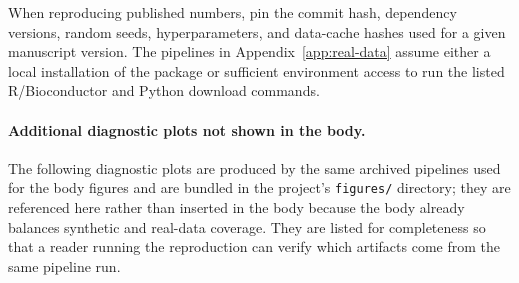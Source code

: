 When reproducing published numbers, pin the commit hash, dependency versions, random seeds,
hyperparameters, and data-cache hashes used for a given manuscript version. The pipelines in
Appendix~\ref{app:real-data} assume either a local installation of the package or sufficient
environment access to run the listed R/Bioconductor and Python download commands.

\paragraph{Additional diagnostic plots not shown in the body.}
The following diagnostic plots are produced by the same archived pipelines used for the body
figures and are bundled in the project's \texttt{figures/} directory; they are referenced here
rather than inserted in the body because the body already balances synthetic and real-data
coverage. They are listed for completeness so that a reader running the reproduction can verify
which artifacts come from the same pipeline run.
